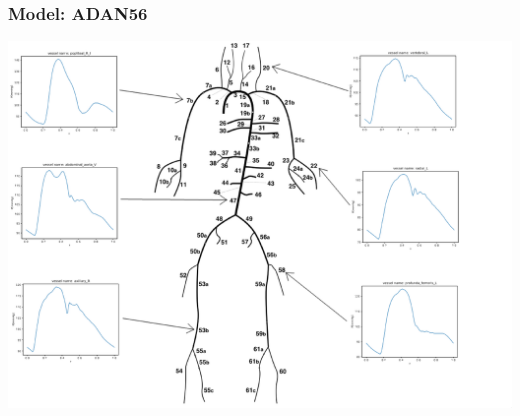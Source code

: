 \documentclass{beamer}
\begin{document}
	\begin{frame}
		\frametitle{Model: ADAN56}
		\includegraphics[width=\textwidth]{images/adan56.eps}
	\end{frame}
\end{document}
